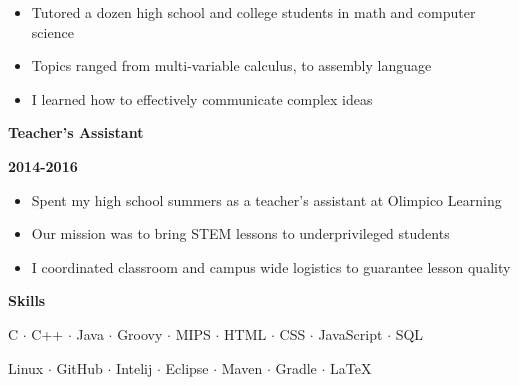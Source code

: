 \documentclass[12pt]{report}
\newcommand\barTitle[1]{\begin{center} \begin{Large}{\textbf{#1}}\end{Large}\end{center}}
\newcommand\tbf[1]{\begin{large} \textbf{#1} \end{large}}
\begin{document}
\begin{itemize}
\item Tutored a dozen high school and college students in math and computer science
\item Topics ranged from multi-variable calculus, to assembly language 
\item I learned how to effectively communicate complex ideas
\end{itemize}

\begin{flushleft}
\tbf{Teacher's Assistant} \hfill \tbf{2014-2016}
\end{flushleft}

\begin{itemize}
\item Spent my high school summers as a teacher's assistant at Olimpico Learning
\item Our mission was to bring STEM lessons to underprivileged students
\item I coordinated classroom and campus wide logistics to guarantee lesson quality  
\end{itemize}


\noindent\makebox[\linewidth]{\rule{7.5in}{0.4pt}}
\barTitle{Skills}
\begin{center}
C $\cdot$ C++ $\cdot$ Java $\cdot$ Groovy $\cdot$  MIPS $\cdot$ HTML $\cdot$ CSS $\cdot$ JavaScript $\cdot$ SQL 
\end{center}
\begin{center}
 Linux $\cdot$ GitHub $\cdot$ Intelij $\cdot$ Eclipse $\cdot$ Maven $\cdot$ Gradle $\cdot$ LaTeX
\end{center}
\end{document}
